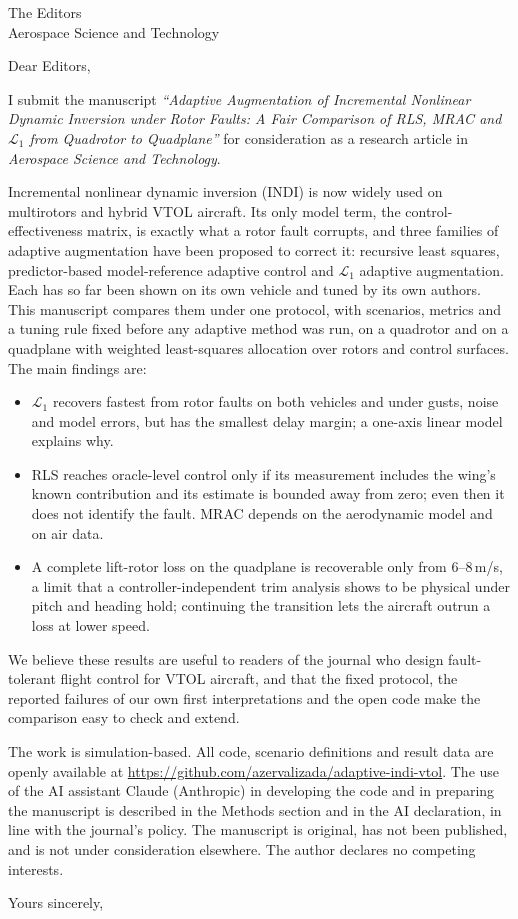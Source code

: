 \documentclass[11pt,a4paper]{letter}
\date{\today}
\begin{document}
\begin{letter}{The Editors\\ Aerospace Science and Technology}
\opening{Dear Editors,}

I submit the manuscript \emph{``Adaptive Augmentation of Incremental Nonlinear Dynamic Inversion under Rotor Faults: A Fair
Comparison of RLS, MRAC and $\mathcal{L}_1$ from Quadrotor to Quadplane''} for consideration as a research article in
\emph{Aerospace Science and Technology}.

Incremental nonlinear dynamic inversion (INDI) is now widely used on multirotors and hybrid VTOL aircraft. Its only model term,
the control-effectiveness matrix, is exactly what a rotor fault corrupts, and three families of adaptive augmentation have been
proposed to correct it: recursive least squares, predictor-based model-reference adaptive control and $\mathcal{L}_1$ adaptive
augmentation. Each has so far been shown on its own vehicle and tuned by its own authors. This manuscript compares them under one
protocol, with scenarios, metrics and a tuning rule fixed before any adaptive method was run, on a quadrotor and on a quadplane
with weighted least-squares allocation over rotors and control surfaces. The main findings are:
\begin{itemize}
\item $\mathcal{L}_1$ recovers fastest from rotor faults on both vehicles and under gusts, noise and model errors, but has the
smallest delay margin; a one-axis linear model explains why.
\item RLS reaches oracle-level control only if its measurement includes the wing's known contribution and its estimate is
bounded away from zero; even then it does not identify the fault. MRAC depends on the aerodynamic model and on air data.
\item A complete lift-rotor loss on the quadplane is recoverable only from 6--8\,m/s, a limit that a controller-independent trim
analysis shows to be physical under pitch and heading hold; continuing the transition lets the aircraft outrun a loss at lower
speed.
\end{itemize}
We believe these results are useful to readers of the journal who design fault-tolerant flight control for VTOL aircraft, and
that the fixed protocol, the reported failures of our own first interpretations and the open code make the comparison easy to
check and extend.

The work is simulation-based. All code, scenario definitions and result data are openly available at
\url{https://github.com/azervalizada/adaptive-indi-vtol}. The use of the AI assistant Claude (Anthropic) in developing the code
and in preparing the manuscript is described in the Methods section and in the AI declaration, in line with the journal's policy.
The manuscript is original, has not been published, and is not under consideration elsewhere. The author declares no competing
interests.

\closing{Yours sincerely,}
\end{letter}
\end{document}
